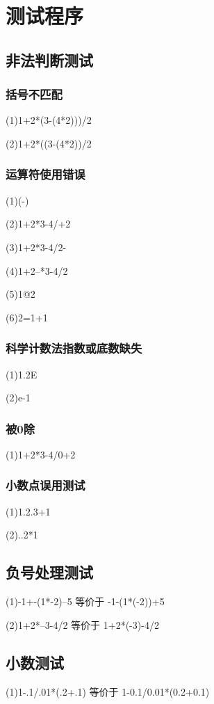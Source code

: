 \documentclass[UTF8]{ctexart}
\begin{document}
\section{测试程序}
\subsection{非法判断测试}
\subsubsection{括号不匹配}

(1)1+2*(3-(4*2)))/2

(2)1+2*((3-(4*2))/2

\subsubsection{运算符使用错误}

(1)(-)

(2)1+2*3-4/+2

(3)1+2*3-4/2-
		               
(4)1+2--*3-4/2

(5)1@2

(6)2=1+1

\subsubsection{科学计数法指数或底数缺失}

(1)1.2E

(2)e-1

\subsubsection{被0除}

(1)1+2*3-4/0+2

\subsubsection{小数点误用测试}

(1)1.2.3+1

(2)..2*1

\subsection{负号处理测试}
(1)-1+-(1*-2)--5 等价于 -1-(1*(-2))+5

(2)1+2*--3-4/2 等价于 1+2*(-3)-4/2

\subsection{小数测试}
(1)1-.1/.01*(.2+.1) 等价于 1-0.1/0.01*(0.2+0.1)
\end{document}
